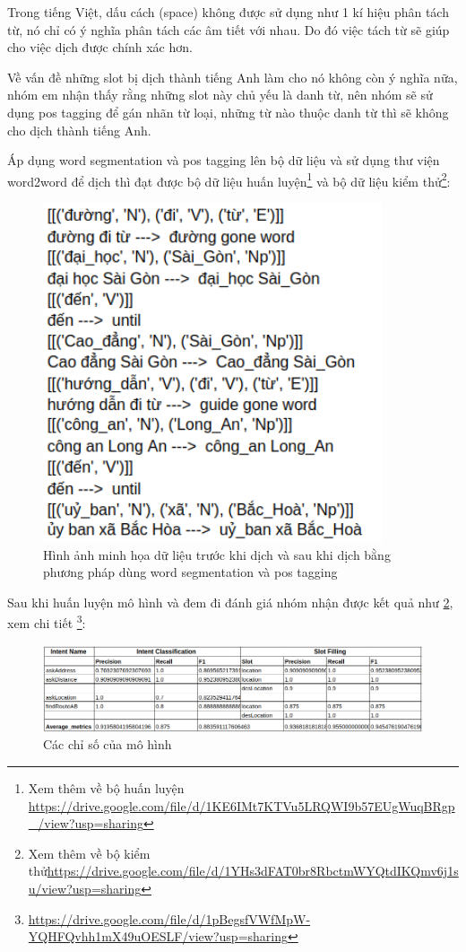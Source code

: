 Trong tiếng Việt, dấu cách (space) không được sử dụng như 1 kí hiệu phân tách từ, nó chỉ có ý nghĩa phân tách các âm tiết với nhau. Do đó việc tách từ sẽ giúp cho việc dịch được chính xác hơn.

Về vấn đề những slot bị dịch thành tiếng Anh làm cho nó không còn ý nghĩa nữa, nhóm em nhận thấy rằng những slot này chủ yếu là danh từ, nên nhóm sẽ sử dụng pos tagging để gán nhãn từ loại, những từ nào thuộc danh từ thì sẽ không cho dịch thành tiếng Anh.

Áp dụng word segmentation và pos tagging lên bộ dữ liệu và sử dụng thư viện word2word để dịch thì đạt được bộ dữ liệu huấn luyện\footnote{Xem thêm về bộ huấn luyện \url{https://drive.google.com/file/d/1KE6IMt7KTVu5LRQWI9b57EUgWuqBRgp_/view?usp=sharing}} và bộ dữ liệu kiểm thử\footnote{Xem thêm về bộ kiểm thử\url{https://drive.google.com/file/d/1YHs3dFAT0br8RbctmWYQtdIKQmv6j1su/view?usp=sharing}}:

\begin{figure}[htp]
    \centering
    \includegraphics[width=10cm]{images/trainingdata-wordsegment.png}
    \caption{Hình ảnh minh họa dữ liệu trước khi dịch và sau khi dịch bằng phương pháp dùng word segmentation và pos tagging}
    \label{fig:trainingdata-wordsegment}
\end{figure}

Sau khi huấn luyện mô hình và đem đi đánh giá nhóm nhận được kết quả như \ref{fig:metrics-word2word-postag}, xem chi tiết \footnote{\url{https://drive.google.com/file/d/1pBegsfVWfMpW-YQHFQvhh1mX49uOESLF/view?usp=sharing}}:

\begin{figure}[htp]
    \centering
    \includegraphics[width=15cm]{images/metrics-word2word+postag.png}
    \caption{Các chỉ số của mô hình}
    \label{fig:metrics-word2word-postag}
\end{figure}

